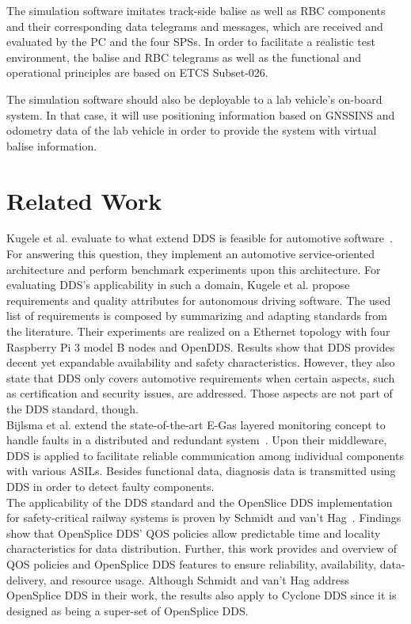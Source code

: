 \documentclass[a4paper, 12pt]{scrartcl}
\begin{document}
The simulation software imitates track-side balise as well as \ac{RBC} components and their corresponding data telegrams and messages, which are received and evaluated by the PC and the four \acp{SPS}.
In order to facilitate a realistic test environment, the balise and \ac{RBC} telegrams as well as the functional and operational principles are based on \ac{ETCS} Subset-026.

The simulation software should also be deployable to a lab vehicle's on-board system.
In that case, it will use positioning information based on \ac{GNSSINS} and odometry data of the lab vehicle in order to provide the system with virtual balise information.


\section*{Related Work}
Kugele et al. evaluate to what extend \ac{DDS} is feasible for automotive software~\cite{KugeleDataCentricForAuto}.
For answering this question, they implement an automotive service-oriented architecture and perform benchmark experiments upon this architecture.
For evaluating \ac{DDS}'s applicability in such a domain, Kugele et al. propose requirements and quality attributes for autonomous driving software.
The used list of requirements is composed by summarizing and adapting standards from the literature.
Their experiments are realized on a Ethernet topology with four Raspberry Pi 3 model B nodes and OpenDDS.
Results show that \ac{DDS} provides decent yet expandable availability and safety characteristics.
However, they also state that \ac{DDS} only covers automotive requirements when certain aspects, such as certification and security issues, are addressed.
Those aspects are not part of the \ac{DDS} standard, though.
\\

Bijlsma et al. extend the state-of-the-art E-Gas layered monitoring concept to handle faults in a distributed and redundant system~\cite{DistributedSafety2020}.
Upon their middleware, \ac{DDS} is applied to facilitate reliable communication among individual components with various \acp{ASIL}.
Besides functional data, diagnosis data is transmitted using \ac{DDS} in order to detect faulty components.
\\

The applicability of the \ac{DDS} standard and the OpenSlice DDS implementation for safety-critical railway systems is proven by Schmidt and van't Hag~\cite{SchmidtMissionCriticalChallenges}.
Findings show that OpenSplice DDS' \ac{QOS} policies allow predictable time and locality characteristics for data distribution.
Further, this work provides and overview of \ac{QOS} policies and OpenSplice DDS features to ensure reliability, availability, data-delivery, and resource usage.
Although Schmidt and van't Hag address OpenSplice DDS in their work, the results also apply to Cyclone DDS since it is designed as being a super-set of OpenSplice DDS.
\\
\end{document}
